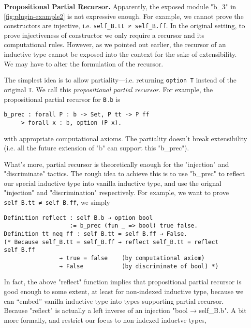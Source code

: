 \textbf{Propositional Partial Recursor.}
Apparently, the exposed module "b_3" in \cref{fig:plugin-example2} is not expressive enough. For example, we cannot prove the constructors are injective, i.e. \texttt{self_B.tt ≠ self_B.ff}. In the original setting, to prove injectiveness of constructor we only require a recursor and its computational rules. However, as we pointed out earlier, the recursor of an inductive type cannot be exposed into the context for the sake of extensibility. We may have to alter the formulation of the recursor.


The simplest idea is to allow partiality---i.e. returning \texttt{option T} instead of the original \texttt{T}. We call this \textit{propositional partial recursor}. For example, the propositional partial recursor for \texttt{B.b} is 
\begin{verbatim}
b_prec : forall P : b -> Set, P tt -> P ff 
    -> forall x : b, option (P x). 
\end{verbatim}
with appropriate computational axioms. The partiality doesn't break extensibility (i.e. all the future extension of "b" can support this "b_prec"). 

What's more, partial recursor is theoretically enough for the "injection" and "discriminate" tactics. The rough idea to achieve this is to use "b_prec" to reflect our special inductive type into vanilla inductive type, and use the orignal "injection" and "discrimination" respectively. For example, we want to prove \texttt{self_B.tt ≠ self_B.ff}, we simply 
\begin{verbatim}
Definition reflect : self_B.b → option bool 
                   := b_prec (fun _ => bool) true false.
Definition tt_neq_ff : self_B.tt = self_B.ff → False.
(* Because self_B.tt = self_B.ff → reflect self_B.tt = reflect self_B.ff 
                → true = false    (by computational axiom)
                → False           (by discriminate of bool) *)
\end{verbatim}



In fact, the above "reflect" function implies that propositional partial recursor is good enough to some extent, at least for non-indexed inductive type, because we can ``embed'' vanilla inductive type into types supporting partial recursor. Because "reflect" is actually a left inverse of an injection "bool → self_B.b". A bit more formally, and restrict our focus to non-indexed inductve types,

